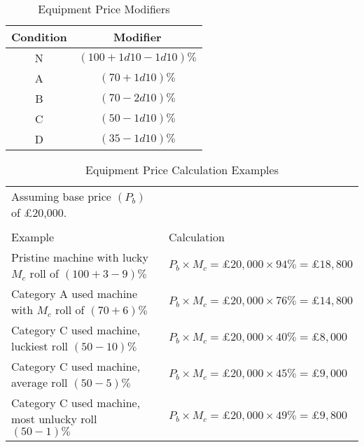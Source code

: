 \documentclass[a4paper,10pt]{article}
\begin{document}
\begin{table}
\begin{center}
  \caption{Equipment Price Modifiers}
  \begin{tabular}{cc}
    \toprule
    Condition & Modifier\\
    \midrule
    N         & $(100 + 1d10 - 1d10)\%$\\
    A         & $(70 + 1d10)\%$\\
    B         & $(70 - 2d10)\%$\\
    C         & $(50 - 1d10)\%$\\
    D         & $(35 - 1d10)\%$\\
    \bottomrule
  \end{tabular}
  \label{tab:equipmentPriceModifiers}
\end{center}
\end{table}

\begin{table}
  \caption{Equipment Price Calculation Examples}
  \begin{center}
  \begin{tabular}{ll}
    Assuming base price $(P_b)$ of \pounds{}20,000.\\
    \\
    \toprule
    Example &
    Calculation
    \\
    \midrule
    Pristine machine with lucky $M_c$ roll of $(100 + 3 - 9)\%$ &
    $P_b \times M_c = \pounds{}20,000 \times 94\% = \pounds{}18,800$
    \\
    Category A used machine with $M_c$ roll of $(70 + 6)\%$ &
    $P_b \times M_c = \pounds{}20,000 \times 76\% = \pounds{}14,800$
    \\
    Category C used machine, luckiest roll $(50 - 10)\%$&
    $P_b \times M_c = \pounds{}20,000 \times 40\% = \pounds{}8,000$
    \\
    Category C used machine, average roll $(50 - 5)\%$&
    $P_b \times M_c = \pounds{}20,000 \times 45\% = \pounds{}9,000$
    \\
    Category C used machine, most unlucky roll $(50 - 1)\%$&
    $P_b \times M_c = \pounds{}20,000 \times 49\% = \pounds{}9,800$
    \\
    \bottomrule
  \end{tabular}
  \end{center}
  \label{tab:equipmentPriceCalculationExamples}
\end{table}
\end{document}
